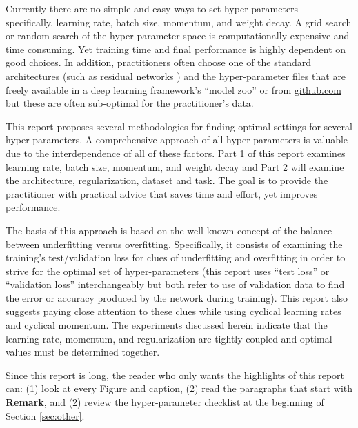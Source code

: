 \documentclass{article} %
\begin{document}
Currently there are no simple and easy ways to  set hyper-parameters -- specifically, learning rate, batch size, momentum, and weight decay. A grid search or random search \citep{bergstra2012random} of the hyper-parameter space is computationally  expensive and time consuming.  Yet training time and final performance is highly dependent on good choices.  In addition, practitioners often choose one of the standard architectures (such as  residual networks \citep{he2016deep}) and the hyper-parameter files that are freely available in a deep learning framework's ``model zoo'' or from \url{github.com} but these are often sub-optimal for the practitioner's data.  

This report proposes several methodologies for finding optimal settings for several hyper-parameters.  A comprehensive approach of all hyper-parameters is valuable due to the interdependence of all of these factors.  Part 1 of this report examines learning rate, batch size, momentum, and weight decay and Part 2 will examine the architecture, regularization, dataset and task.  The goal is to provide the practitioner with practical advice that saves time and effort, yet improves performance.

The basis of this approach is based on the well-known concept of the balance between underfitting versus overfitting.  Specifically, it consists of examining the training's test/validation loss for clues of underfitting and overfitting in order to strive for the optimal set of hyper-parameters (this report uses ``test loss'' or ``validation loss'' interchangeably but both refer to use of validation data to find the error or accuracy produced by the network during training).  This report also suggests paying close attention to these clues while using cyclical learning rates \citep{smith2017cyclical} and cyclical momentum.  The experiments discussed herein indicate that the learning rate, momentum, and regularization are tightly coupled and optimal values must be determined together. 

Since this report is long, the reader who only wants the  highlights of this report can: (1) look at every Figure and caption, (2) read the paragraphs that start with \textbf{Remark}, and (2) review the hyper-parameter checklist at the beginning of Section \ref{sec:other}.
\end{document}
